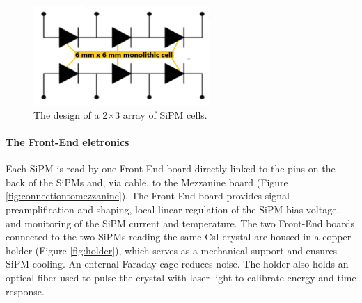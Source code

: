 \begin{figure}[!h]
    \centering
    \includegraphics[width =0.6\textwidth]{figures/png/Screenshot_20240706_141625.png}
    \caption[The design of SiPM cells.]{The design of a 2$\times$3 array of SiPM cells.}
    \label{fig:sipmcell}
\end{figure}
\paragraph{The Front-End eletronics}
Each SiPM is read by one Front-End board directly linked to the pins on the 
back of the SiPMs and, via cable, to the Mezzanine board (Figure \ref{fig:connectiontomezzanine}). 
The Front-End board provides signal preamplification and shaping, local linear 
regulation of the SiPM bias voltage, and monitoring of the SiPM current and temperature. 
The two Front-End boards connected to the two SiPMs reading the same CsI 
crystal are housed in a copper holder (Figure \ref{fig:holder}), which 
serves as a mechanical support and ensures SiPM cooling. 
An enternal Faraday cage reduces noise. The holder also holds 
an optical fiber used to pulse the crystal with laser light to 
calibrate energy and time response.
